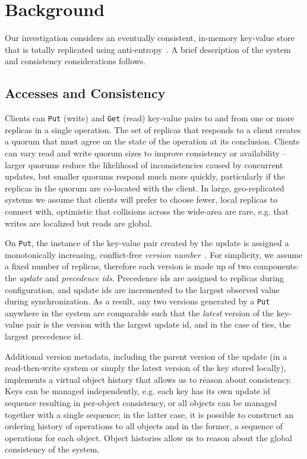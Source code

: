 \section*{Background}

Our investigation considers an eventually consistent, in-memory key-value
store that is totally replicated using
anti-entropy~\cite{decandia_dynamo:_2007}.
A brief description of the system and consistency considerations follows.

\subsection*{Accesses and Consistency}

Clients can \texttt{Put} (write) and \texttt{Get} (read) key-value pairs to
 and from one or more replicas in a single operation.
The set of replicas that responds to a client creates a quorum that must
agree on the state of the operation at its conclusion.
Clients can vary read and write quorum sizes to improve consistency or
availability -- larger quorums reduce the likelihood of inconsistencies
caused by concurrent updates, but smaller quorums respond much more quickly,
particularly if the replicas in the quorum are co-located with the client.
In large, geo-replicated systems we assume that clients will prefer to choose
fewer, local replicas to connect with, optimistic that collisions across the
wide-area are rare, e.g. that writes are localized but reads are global.

On \texttt{Put}, the instance of the key-value pair created by the update is
assigned a monotonically increasing, conflict-free \textit{version
number}~\cite{parker_detection_1983,almeida_version_2002}.
For simplicity, we assume a fixed number of replicas, therefore each version
is made up of two components: the \textit{update} and \textit{precedence ids}.
Precedence ids are assigned to replicas during configuration, and update ids
are incremented to the largest observed value during synchronization.
As a result, any two versions generated by a \texttt{Put} anywhere in the
system are comparable such that the \textit{latest} version of the key-value
pair is the version with the largest update id, and in the case of ties, the
largest precedence id.

Additional version metadata, including the parent version of the update (in a
read-then-write system or simply the latest version of the key stored
locally), implements a virtual object history that allows us to reason about
consistency.
Keys can be managed independently, e.g. each key has its own update id
sequence resulting in per-object consistency, or all objects can be managed
together with a single sequence; in the latter case, it is possible to
construct an ordering history of operations to all objects and in the former,
a sequence of operations for each object.
Object histories allow us to reason about the global consistency of the
system.

